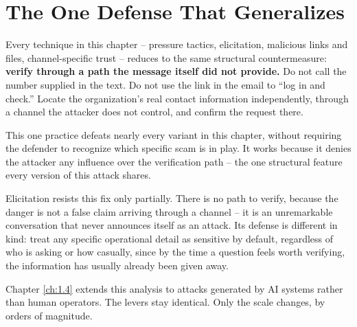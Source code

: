 \section*{The One Defense That Generalizes}

Every technique in this chapter -- pressure tactics, elicitation, malicious links and files,
channel-specific trust -- reduces to the same structural countermeasure: \textbf{verify through a
path the message itself did not provide.} Do not call the number supplied in the text. Do not use
the link in the email to ``log in and check.'' Locate the organization's real contact information
independently, through a channel the attacker does not control, and confirm the request there.

This one practice defeats nearly every variant in this chapter, without requiring the defender to
recognize which specific scam is in play. It works because it denies the attacker any influence
over the verification path -- the one structural feature every version of this attack shares.

Elicitation resists this fix only partially. There is no path to verify, because the danger is not
a false claim arriving through a channel -- it is an unremarkable conversation that never announces
itself as an attack. Its defense is different in kind: treat any specific operational detail as
sensitive by default, regardless of who is asking or how casually, since by the time a question
feels worth verifying, the information has usually already been given away.

Chapter \ref{ch:1.4} extends this analysis to attacks generated by AI systems rather than human
operators. The levers stay identical. Only the scale changes, by orders of magnitude.

